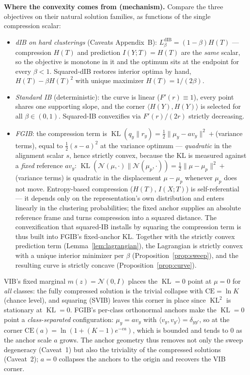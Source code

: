 \textbf{Where the convexity comes from (mechanism).}
Compare the three objectives on their natural solution families, as functions of the single
compression scalar:
\begin{itemize}
\item \emph{dIB on hard clusterings} (Caveats Appendix~B): $L^{\mathrm{dIB}}_\beta
= (1-\beta)H(T)$ --- compression $H(T)$ and prediction $I(Y;T) = H(T)$ are the \emph{same}
scalar, so the objective is monotone in it and the optimum sits at the endpoint for every
$\beta < 1$. Squared-dIB restores interior optima by hand, $H(T) - \beta H(T)^2$ with
unique maximizer $H(T) = 1/(2\beta)$.
\item \emph{Standard IB} (deterministic): the curve is linear ($F'(r) \equiv 1$), every
point shares one supporting slope, and the corner $\langle H(Y), H(Y)\rangle$ is selected
for all $\beta \in (0,1)$. Squared-IB convexifies via $F'(r)/(2r)$ strictly decreasing.
\item \emph{FGIB}: the compression term is $\operatorname{KL}(q_y \| r_y) =
\tfrac{1}{2}\|\mu_y - a v_y\|^2 + {}$(variance terms), equal to $\tfrac{1}{2}(s-a)^2$
at the variance optimum --- \emph{quadratic} in the alignment scalar $s$, hence strictly
convex, because the KL is measured against a
\emph{fixed} reference $a v_y$: $\operatorname{KL}(\mathcal{N}(\mu,\cdot)\|\mathcal{N}(\mu_p,\cdot))
= \tfrac{1}{2}\|\mu - \mu_p\|^2 + {}$(variance terms) is quadratic in the displacement
$\mu - \mu_p$ whenever $\mu_p$ does not move. Entropy-based compression ($H(T)$, $I(X;T)$)
is self-referential --- it depends only on the representation's own distribution and enters
linearly in the clustering probabilities; the fixed anchor supplies an absolute reference
frame and turns compression into a squared distance. The convexification that squared-IB
installs by squaring the compression term is thus built into FGIB's fixed-anchor KL.
Together with the strictly convex prediction term (Lemma~\ref{lem:lagrangian}), the
Lagrangian is strictly convex with a unique interior minimizer per $\beta$
(Proposition~\ref{prop:sweep}), and the resulting curve is strictly concave
(Proposition~\ref{prop:curve}).
\end{itemize}

\begin{remark}\label{rem:endpoint}
VIB's fixed marginal $m(z) = \mathcal{N}(0, I)$ places the $\operatorname{KL}=0$ point at
$\mu = 0$ for \emph{all} classes: the fully compressed solution is the trivial collapse with
$\mathrm{CE} = \ln K$ (chance level), and squaring (SVIB) leaves this corner in place since
$\operatorname{KL}^2$ is stationary at $\operatorname{KL}=0$. FGIB's per-class orthonormal
anchors make the $\operatorname{KL}=0$ point a \emph{class-separated} configuration:
$\mu_y = a v_y$ with $\langle v_y, v_{y'}\rangle = \delta_{yy'}$, so at the corner
$\mathrm{CE}(a) = \ln(1 + (K-1)e^{-ca})$, which is bounded and tends to $0$ as the anchor
scale $a$ grows. The anchor geometry thus removes not only the sweep degeneracy (Caveat~1)
but also the triviality of the compressed solutions (Caveat~2); $a = 0$ collapses the
anchors to the origin and recovers the VIB corner.
\end{remark}

